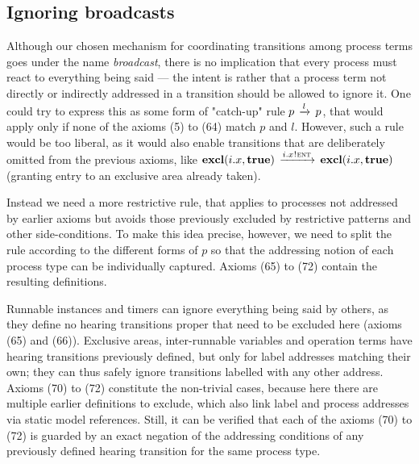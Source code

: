 \documentclass[10pt,conference]{IEEEtran}
\begin{document}
\subsection{Ignoring broadcasts} \label{sect:Ignore}

Although our chosen mechanism for coordinating transitions among process terms goes under the name \emph{broadcast}, there is no implication that every process must react to everything being said --- the intent is rather that a process term not directly or indirectly addressed in a transition should be allowed to ignore it. One could try to express this as some form of "catch-up" rule $p \,\xrightarrow{l}\, p$, that would apply only if none of the axioms (5) to (64) match $p$ and $l$. However, such a rule would be too liberal, as it would also enable transitions that are deliberately omitted from the previous axioms, like ${\textbf{excl}(i.x,\textbf{true})} \,\xrightarrow{i.x \mspace{1mu}!\mspace{1mu} \textsc{ent}}\, {\textbf{excl}(i.x,\textbf{true})}$ (granting entry to an exclusive area already taken).

Instead we need a more restrictive rule, that applies to processes not addressed by earlier axioms but avoids those previously excluded by restrictive patterns and other side-conditions. To make this idea precise, however, we need to split the rule according to the different forms of $p$ so that the addressing notion of each process type can be individually captured. Axioms (65) to (72) contain the resulting definitions.

Runnable instances and timers can ignore everything being said by others, as they define no hearing transitions proper that need to be excluded here (axioms (65) and (66)). Exclusive areas, inter-runnable variables and operation terms have hearing transitions previously defined, but only for label addresses matching their own; they can thus safely ignore transitions labelled with any other address.
Axioms (70) to (72) constitute the non-trivial cases, because here there are multiple earlier definitions to exclude, which also link label and process addresses via static model references. Still, it can be verified that each of the axioms (70) to (72) is guarded by an exact negation of the addressing conditions of any previously defined hearing transition for the same process type.
\end{document}
